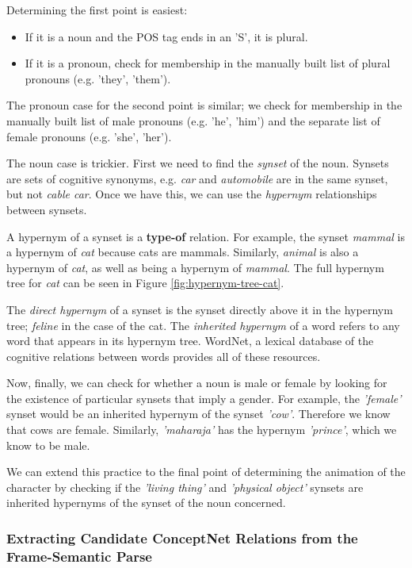 Determining the first point is easiest:
\begin{itemize}
\item{If it is a noun and the POS tag ends in an 'S', it is plural.}
\item{If it is a pronoun, check for membership in the manually built list of plural pronouns (e.g. 'they', 'them').}
\end{itemize}

The pronoun case for the second point is similar; we check for membership in the manually built list of male pronouns (e.g. 'he', 'him') and the separate list of female pronouns (e.g. 'she', 'her'). 

The noun case is trickier. First we need to find the \textit{synset} of the noun. Synsets are sets of cognitive synonyms, e.g. \textit{car} and \textit{automobile} are in the same synset, but not \textit{cable car}. Once we have this, we can use the \textit{hypernym} relationships between synsets.

A hypernym of a synset is a \textbf{type-of} relation. For example, the synset \textit{mammal} is a hypernym of \textit{cat} because cats are mammals. Similarly, \textit{animal} is also a hypernym of \textit{cat}, as well as being a hypernym of \textit{mammal}. The full hypernym tree for \textit{cat} can be seen in Figure \ref{fig:hypernym-tree-cat}. 

The \textit{direct hypernym} of a synset is the synset directly above it in the hypernym tree; \textit{feline} in the case of the cat. The \textit{inherited hypernym} of a word refers to any word that appears in its hypernym tree. WordNet\cite{miller1995wordnet}, a lexical database of the cognitive relations between words provides all of these resources.

Now, finally, we can check for whether a noun is male or female by looking for the existence of particular synsets that imply a gender. For example, the \textit{'female'} synset would be an inherited hypernym of the synset \textit{'cow'}. Therefore we know that cows are female. Similarly, \textit{'maharaja'} has the hypernym \textit{'prince'}, which we know to be male.

We can extend this practice to the final point of determining the animation of the character by checking if the \textit{'living thing'} and \textit{'physical object'} synsets are inherited hypernyms of the synset of the noun concerned.


\subsubsection{Extracting Candidate ConceptNet Relations from the Frame-Semantic Parse}
\label{sec:candidate}

